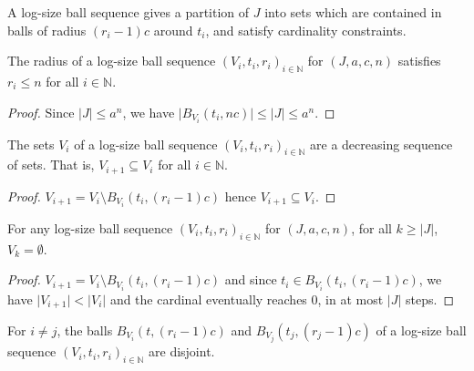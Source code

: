 A log-size ball sequence gives a partition of $J$ into sets which are contained in balls of radius $(r_i - 1)c$ around $t_i$, and satisfy cardinality constraints.


\begin{lemma}\label{lem:logSizeRadius_logSizeBallSequence_le}
  \leanok
The radius of a log-size ball sequence $(V_i, t_i, r_i)_{i \in \mathbb{N}}$ for $(J, a, c, n)$ satisfies $r_i \le n$ for all $i \in \mathbb{N}$.
\end{lemma}

\begin{proof}
Since $|J| \le a^n$, we have $\vert B_{V_i}(t_i, n c) \vert \le \vert J \vert \le a^{n}$.
\end{proof}


\begin{lemma}\label{lem:logSizeBallSequence_V_anti}
  \leanok
The sets $V_i$ of a log-size ball sequence $(V_i, t_i, r_i)_{i \in \mathbb{N}}$ are a decreasing sequence of sets. That is, $V_{i+1} \subseteq V_i$ for all $i \in \mathbb{N}$.
\end{lemma}

\begin{proof}
$V_{i+1} = V_i \setminus B_{V_i}(t_i, (r_i - 1)c)$ hence $V_{i+1} \subseteq V_i$.
\end{proof}


\begin{lemma}\label{lem:logSizeBallSequence_eq_zero}
  \leanok
For any log-size ball sequence $(V_i, t_i, r_i)_{i \in \mathbb{N}}$ for $(J, a, c, n)$, for all $k \ge \vert J \vert$, $V_k = \emptyset$.
\end{lemma}

\begin{proof}
$V_{i+1} = V_i \setminus B_{V_i}(t_i, (r_i - 1)c)$ and since $t_i \in B_{V_i}(t_i, (r_i - 1)c)$, we have $\vert V_{i+1} \vert < \vert V_i \vert$ and the cardinal eventually reaches $0$, in at most $\vert J \vert$ steps.
\end{proof}


\begin{lemma}\label{lem:logSizeBallSequence_disjoint_B}
  \leanok
For $i \ne j$, the balls $B_{V_i}(t, (r_i-1)c)$ and $B_{V_j}(t_j, (r_j-1)c)$ of a log-size ball sequence $(V_i, t_i, r_i)_{i \in \mathbb{N}}$ are disjoint.
\end{lemma}

